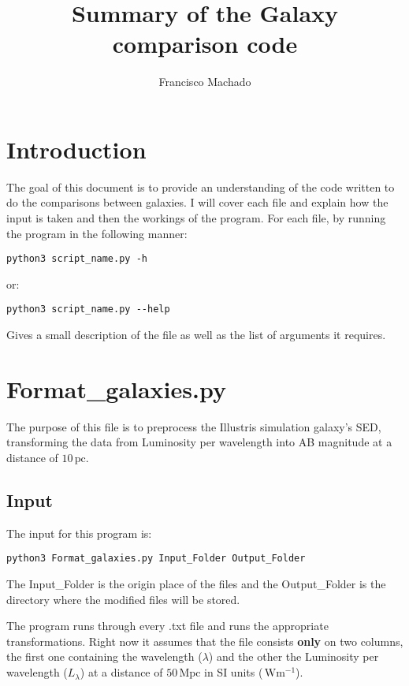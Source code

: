 \documentclass[11pt]{article}
\author{Francisco Machado}
\title{Summary of the Galaxy comparison code}
\newcommand{\unit}[1]{\ensuremath{\, \mathrm{#1}}}
\begin{document}
\maketitle

\section{Introduction}

The goal of this document is to provide an understanding of the code written to do the comparisons between galaxies.
I will cover each file and explain how the input is taken and then the workings of the program.
For each file, by running the program in the following manner:
\begin{verbatim}
python3 script_name.py -h
\end{verbatim}
or:
\begin{verbatim}
python3 script_name.py --help
\end{verbatim}

Gives a small description of the file as well as the list of arguments it requires.

\newpage

\section{Format\_galaxies.py}

The purpose of this file is to preprocess the Illustris simulation galaxy's SED, transforming the data from Luminosity per wavelength into AB magnitude at a distance of $10 \unit{pc}$.

\subsection{Input}

The input for this program is:
\begin{verbatim}
python3 Format_galaxies.py Input_Folder Output_Folder
\end{verbatim}

The Input\_Folder is the origin place of the files and the Output\_Folder is the directory where the modified files will be stored.

The program runs through every .txt file and runs the appropriate transformations. Right now it assumes that the file consists {\bf only} on two columns, the first one containing the wavelength ($\lambda$) and the other the Luminosity per wavelength ($L_\lambda$) at a distance of $50 \unit{Mpc}$ in SI units ($\unit{W m^{-1}}$).
\end{document}

